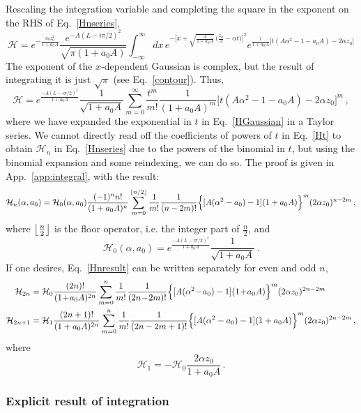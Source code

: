\documentclass[a4,letterpaper,11pt]{article}
\newcommand{\nn}{\nonumber}
\newcommand{\be}{\begin{equation}}
\newcommand{\ee}{\end{equation}}
\newcommand{\minus}{\!-\!}
\newcommand{\plus}{\!+\!}
\newcommand{\cH}{\mathcal{H}}
\newcommand{\eq}[1]{Eq.~\eqref{#1}}
\newcommand{\appx}[1]{App.~\ref{app:#1}}
\DeclarePairedDelimiter\floor{\lfloor}{\rfloor}
\begin{document}
Rescaling the integration variable and completing the square in the exponent on the RHS of \eq{Hnseries},
\be
\label{HGaussian}
\cH =  e^{-\frac{a_0 z_0^2}{1+a_0 A}} \frac{e^{-A(L-i\pi/2)^2}}{\sqrt{\pi(1+a_0A)}}\int_{-\infty}^\infty dx\, e^{-\bigl[ x + \sqrt{\frac{A}{1+a_0 A}}\,\bigl( \frac{z_0}{A} - \alpha t\bigr )\bigr]^2} e^{\frac{t}{1+a_0 A}\bigl[t(A\alpha^2 - 1 - a_0 A) - 2 \alpha z_0 \bigr] }
\ee
The exponent of the $x$-dependent Gaussian is complex, but the result of integrating it is just $\sqrt{\pi}$ (see \eq{contour}). Thus,
\be
\label{Ht}
\cH = e^{\frac{-A (L-i\pi/2)^2}{1+a_0 A}} \frac{1}{\sqrt{1+a_0 A}} \sum_{m=0}^\infty \frac{t^m}{m!}\frac{1}{(1+a_0 A)^m}\bigl[ t (A\alpha^2 - 1 - a_0 A) - 2\alpha z_0\bigr]^m\,,
\ee
where we have expanded the exponential in $t$ in \eq{HGaussian} in a Taylor series. We cannot directly read off the coefficients of powers of $t$ in \eq{Ht} to obtain $\cH_n$ in \eq{Hnseries} due to the powers of the binomial in $t$, but using the binomial expansion and some reindexing, we can do so. The proof is given in \appx{integral}, with the result:
\be
\label{Hnresult}
\cH_n(\alpha,a_0) = \cH_0(\alpha,a_0) \frac{(-1)^n n!}{(1+a_0 A)^n}\sum_{m=0}^{\floor*{n/2}}\frac{1}{m!}\frac{1}{(n-2m)!} \Bigl\{ [ A(\alpha^2 - a_0)-1] (1+a_0 A)\Bigr\}^m (2\alpha z_0)^{n-2m} \,,
\ee
where $\floor*{\frac{n}{2}}$ is the floor operator, i.e. the integer part of $\frac{n}{2}$, and
\be
\cH_0(\alpha,a_0) =  e^{\frac{-A(L-i\pi/2)^2}{1+a_0 A}} \frac{1}{\sqrt{1+a_0 A}} \,.
\ee
If one desires, \eq{Hnresult} can be written separately for even and odd $n$,
\begin{align}
\cH_{2n} &= \cH_0 \frac{(2n)!}{(1\plus a_0 A)^{2n}} \sum_{m=0}^n \frac{1}{m!}\frac{1}{(2n\minus 2m)!} \Bigl\{ [ A(\alpha^2 \minus a_0)-1] (1\plus a_0 A)\Bigr\}^m (2\alpha z_0)^{2n-2m} \\
\cH_{2n+1} &= \cH_1 \frac{(2n+1)!}{(1+a_0 A)^{2n}} \sum_{m=0}^n \frac{1}{m!}\frac{1}{(2n-2m+1)!} \Bigl\{ [ A(\alpha^2 - a_0)-1] (1+a_0 A)\Bigr\}^m (2\alpha z_0)^{2n-2m}\,, \nn
\end{align}
where
\be
\cH_1 = - \cH_0 \frac{2\alpha z_0}{1+a_0 A}\,.
\ee

\subsubsection{Explicit result of integration}
\end{document}
